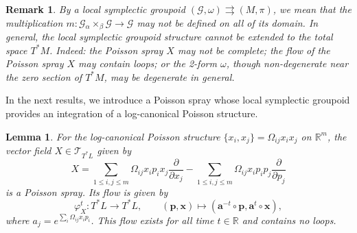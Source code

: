 \documentclass{amsart}
\newtheorem{lemma}[theorem]{Lemma}
\newtheorem{remark}[theorem]{Remark}
\numberwithin{equation}{section}
\newcommand{\bfa}{\mathbf{a}}
\newcommand{\bfp}{\mathbf{p}}
\newcommand{\bfx}{\mathbf{x}}
\newcommand{\cG}{\mathcal{G}}
\newcommand{\cT}{\mathcal{T}}
\newcommand{\RR}{\mathbb{R}}
\newcommand{\rra}{\rightrightarrows}
\begin{document}
\begin{remark}
  By a local symplectic groupoid $(\cG, \omega) \rra (M, \pi)$, we mean that the multiplication $m: \cG {_\alpha \times_\beta} \cG \to \cG$ may not be defined on all of its domain.
  In general, the local symplectic groupoid structure cannot be extended to the total space $T^*M$.
  Indeed: the Poisson spray $X$ may not be complete; the flow of the Poisson spray $X$ may contain loops; or the 2-form $\omega$, though non-degenerate near the zero section of $T^*M$, may be degenerate in general.
\end{remark}

In the next results, we introduce a Poisson spray whose local symplectic groupoid provides an integration of a log-canonical Poisson structure.
\begin{lemma}
  For the log-canonical Poisson structure $\{x_i, x_j\} = \Omega_{ij} x_i x_j$ on $\RR^m$, the vector field $X \in \cT_{T^*L}$ given by
  \begin{equation} 
    \label{eq: PoisSp}
    X = \sum_{1 \leq i,j \leq m}\Omega_{ij}x_i p_i x_j\frac{\partial}{\partial x_j} - \sum_{1 \leq i,j \leq m}\Omega_{ij}x_ip_i p_j\frac{\partial}{\partial p_j}
  \end{equation}
  is a Poisson spray.
  Its flow is given by
  \[\varphi_X^t: T^*L \to T^*L, \qquad (\bfp, \bfx) \mapsto (\bfa^{-t} \circ \bfp, \bfa^t \circ \bfx),\]
  where $a_j = e^{\sum_i \Omega_{ij} x_ip_i}$.
  This flow exists for all time $t \in \RR$ and contains no loops.
\end{lemma}
\end{document}
